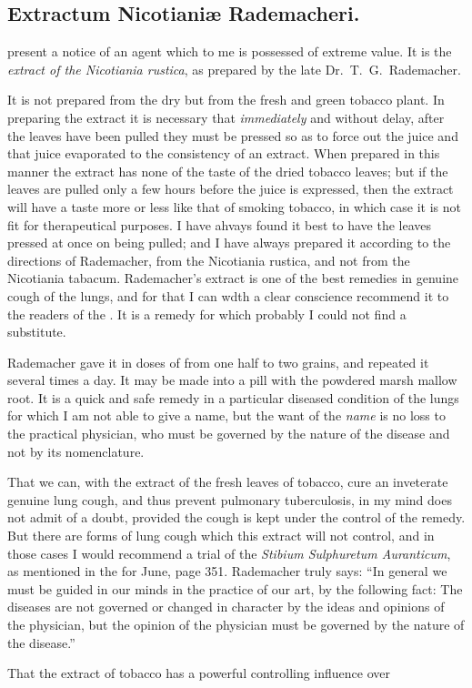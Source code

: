 \subsection*{Extractum Nicotianiæ Rademacheri.}


 present a notice of an agent which to me is possessed of
extreme value. It is the \emph{extract of the Nicotiania rustica}, as prepared
by the late Dr.\ T.~G.\ Rademacher.

It is not prepared from the dry but from the fresh and green tobacco
plant. In preparing the extract it is necessary that \emph{immediately} and
without delay, after the leaves have been pulled they must be pressed
so as to force out the juice and that juice evaporated to the consistency
of an extract. When prepared in this manner the extract has none of
the taste of the dried tobacco leaves; but if the leaves are pulled only
a few hours before the juice is expressed, then the extract will have a
taste more or less like that of smoking tobacco, in which case it is not
fit for therapeutical purposes. I have ahvays found it best to have the
leaves pressed at once on being pulled; and I have always prepared it
according to the directions of Rademacher, from the Nicotiania rustica,
and not from the Nicotiania tabacum. Rademacher's extract is one of
the best remedies in genuine cough of the lungs, and for that I can wdth
a clear conscience recommend it to the readers of the .
It is a remedy for which probably I could not find a substitute.

Rademacher gave it in doses of from one half to two grains, and repeated
it several times a day. It may be made into a pill with the
powdered marsh mallow root. It is a quick and safe remedy in a particular
diseased condition of the lungs for which I am not able to give
a name, but the want of the \emph{name} is no loss to the practical physician,
who must be governed by the nature of the disease and not by its
nomenclature.

That we can, with the extract of the fresh leaves of tobacco, cure an
inveterate genuine lung cough, and thus prevent pulmonary tuberculosis,
in my mind does not admit of a doubt, provided the cough is kept under
the control of the remedy. But there are forms of lung cough which
this extract will not control, and in those cases I would recommend a
trial of the \emph{Stibium Sulphuretum Auranticum}, as mentioned in the
 for June, page 351. Rademacher truly says: ``In
general we must be guided in our minds in the practice of our art, by
the following fact: The diseases are not governed or changed in character
by the ideas and opinions of the physician, but the opinion of
the physician must be governed by the nature of the disease.''

That the extract of tobacco has a powerful controlling influence over\endinput
